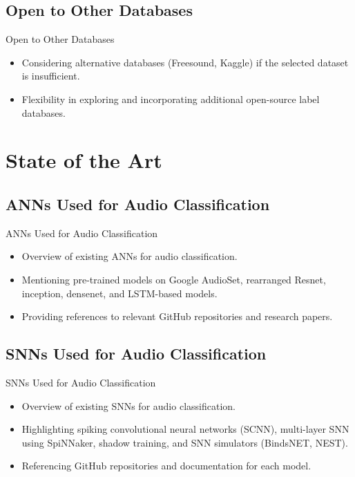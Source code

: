 \documentclass[aspectratio=169, 11pt]{beamer}
\begin{document}
\subsection{Open to Other Databases}

\begin{frame}{Open to Other Databases}
  \begin{itemize}
    \item Considering alternative databases (Freesound, Kaggle) if the selected dataset is insufficient.
    \item Flexibility in exploring and incorporating additional open-source label databases.
  \end{itemize}
\end{frame}

\section{State of the Art}

\subsection{ANNs Used for Audio Classification}

\begin{frame}{ANNs Used for Audio Classification}
  \begin{itemize}
    \item Overview of existing ANNs for audio classification.
    \item Mentioning pre-trained models on Google AudioSet, rearranged Resnet, inception, densenet, and LSTM-based models.
    \item Providing references to relevant GitHub repositories and research papers.
  \end{itemize}
\end{frame}

\subsection{SNNs Used for Audio Classification}

\begin{frame}{SNNs Used for Audio Classification}
  \begin{itemize}
    \item Overview of existing SNNs for audio classification.
    \item Highlighting spiking convolutional neural networks (SCNN), multi-layer SNN using SpiNNaker, shadow training, and SNN simulators (BindsNET, NEST).
    \item Referencing GitHub repositories and documentation for each model.
  \end{itemize}
\end{frame}
\end{document}
